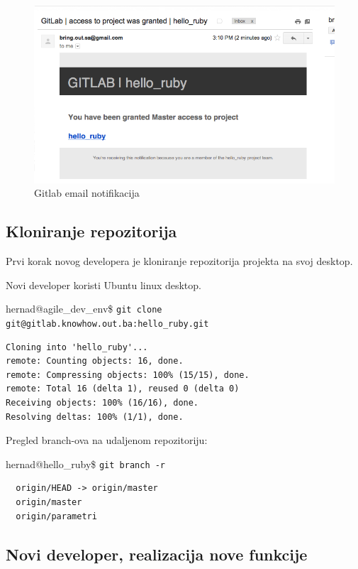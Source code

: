 \documentclass[times, utf8, seminar]{fit}
\begin{document}
\begin{figure}[H]
\centering
\includegraphics[width=15cm]{img/gitlab_email_notification.png}
\caption{Gitlab email notifikacija}
\end{figure}

\subsection{Kloniranje repozitorija}

\setlength{\parindent}{0cm}
Prvi korak novog developera je kloniranje repozitorija projekta na svoj desktop. 

Novi developer koristi Ubuntu linux desktop.

hernad@agile\_dev\_env\$ \newline
\texttt{git clone git@gitlab.knowhow.out.ba:hello\_ruby.git}
\begin{lstlisting}
Cloning into 'hello_ruby'...
remote: Counting objects: 16, done.
remote: Compressing objects: 100% (15/15), done.
remote: Total 16 (delta 1), reused 0 (delta 0)
Receiving objects: 100% (16/16), done.
Resolving deltas: 100% (1/1), done.
\end{lstlisting}

Pregled branch-ova na udaljenom repozitoriju:

hernad@hello\_ruby\$ \texttt{git branch -r}
\begin{lstlisting}
  origin/HEAD -> origin/master
  origin/master
  origin/parametri
\end{lstlisting}

\subsection{Novi developer, realizacija nove funkcije}
\end{document}
